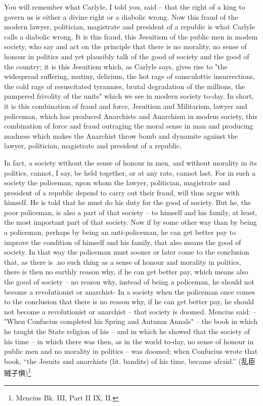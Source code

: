 You will remember what Carlyle, I told you, said -- that the right of a king to govern us is either a divine right or a diabolic wrong. Now this fraud of the modern lawyer, politician, magistrate and president of a republic is what Carlyle calls a diabolic wrong. It is this fraud, this Jesuitism of the public men in modem society, who say and act on the principle that there is no morality, no sense of honour in politics and yet plausibly talk of the good of society and the good of the country; it is this Jesuitism which, as Carlyle says, gives rise to "the widespread suffering, mutiny, delirium, the hot rage of sansculottic insurrections, the cold rage of resuscitated tyrannies, brutal degradation of the millions, the pampered frivolity of the units" which we see in modern society to-day. In short, it is this combination of fraud and force, Jesuitism and Militarism, lawyer and policeman, which has produced Anarchists and Anarchism in modem society, this combination of force and fraud outraging the moral sense in man and producing madness which makes the Anarchist throw bomb and dynamite against the lawyer, politician, magistrate and president of a republic.

In fact, a society without the sense of honour in men, and without morality in its politics, cannot, I say, be held together, or at any rate, cannot last. For in such a society the policeman, upon whom the lawyer, politician, magistrate and president of a republic depend to carry out their fraud, will thus argue with himself. He is told that he must do his duty for the good of society. But he, the poor policeman, is also a part of that society -- to himself and his family, at least, the most important part of that society. Now if by some other way than by being a policeman, perhaps by being an anti-policeman, he can get better pay to improve the condition of himself and his family, that also means the good of society. In that way the policeman must sooner or later come to the conclusion that, as there is .no such thing as a sense of honour and morality in politics, there is then no earthly reason why, if he can get better pay, which means also the good of society -- no reason why, instead of being a policeman, he should not become a revolutionist or anarchist- In a society when the policeman once comes to the conclusion that there is no reason why, if he can get better pay, he should not become a revolutionist or anarchist -- that society is doomed. Mencius said: -- "When Confucius completed his Spring and Autumn Annals" -- the book in which he taught the State religion of his  -- and in which he showed that the society of his time -- in which there was then, as in the world to-day, no sense of honour in public men and no morality in politics -- was doomed; when Confucius wrote that book, ``the Jesuits and anarchists (lit. bandits) of his time, became afraid.'' (乱臣贼子惧)\footnote{Mencius Bk. III, Part II IX, II.}

